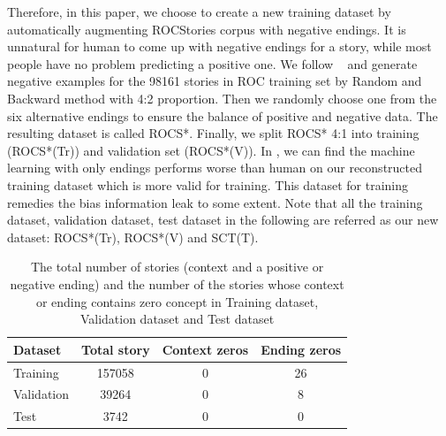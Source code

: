 Therefore, in this paper, we choose to create a new training dataset
by automatically augmenting ROCStories corpus with negative endings.
It is unnatural for human to come up with negative
endings for a story, while most people have no problem predicting a positive
one.
We follow ~\cite{roemmele2017rnn} and generate negative examples for the 98161 stories in ROC training set 
by Random and Backward 
 method with 4:2 proportion. Then we randomly choose one 
from the six alternative endings to ensure the balance of positive and negative data. 
The resulting dataset is called ROCS*.
Finally, we split ROCS* 4:1 into training (ROCS*(Tr)) and 
validation set (ROCS*(V)). 
In  , we can find the machine learning with only endings performs
worse than human on our reconstructed training dataset which is more valid for training. 
This dataset for training remedies the bias information leak to some extent.
Note that all the training dataset, 
validation dataset, test dataset in the following are referred as our new dataset: ROCS*(Tr),
ROCS*(V) and SCT(T).



\begin{table}[th!]
\small
\centering
\begin{tabular}{lccc}
\hline
\textbf{Dataset}&Total story&Context zeros& Ending zeros  \\
\hline
Training& 157058 &0&26\\
Validation&39264&0&8\\
Test&3742&0&0\\
\hline
\end{tabular}
\caption{The total number of stories (context and a positive or negative ending) and  the number 
of the stories whose context or ending contains zero concept 
in Training dataset, Validation dataset and Test dataset }
\label{tab:size2}
\end{table}

